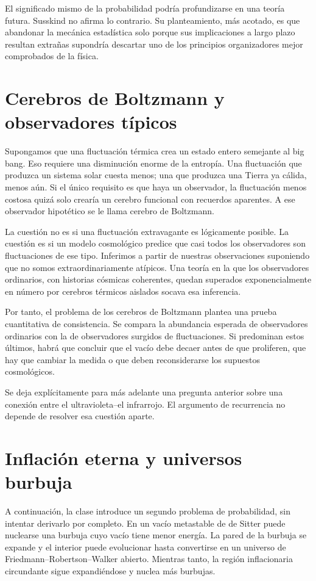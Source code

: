 El significado mismo de la probabilidad podría profundizarse en una teoría futura. Susskind no afirma lo contrario. Su planteamiento, más acotado, es que abandonar la mecánica estadística solo porque sus implicaciones a largo plazo resultan extrañas supondría descartar uno de los principios organizadores mejor comprobados de la física.

\section{Cerebros de Boltzmann y observadores típicos}

Supongamos que una fluctuación térmica crea un estado entero semejante al big bang. Eso requiere una disminución enorme de la entropía. Una fluctuación que produzca un sistema solar cuesta menos; una que produzca una Tierra ya cálida, menos aún. Si el único requisito es que haya un observador, la fluctuación menos costosa quizá solo crearía un cerebro funcional con recuerdos aparentes. A ese observador hipotético se le llama cerebro de Boltzmann.

La cuestión no es si una fluctuación extravagante es lógicamente posible. La cuestión es si un modelo cosmológico predice que casi todos los observadores son fluctuaciones de ese tipo. Inferimos a partir de nuestras observaciones suponiendo que no somos extraordinariamente atípicos. Una teoría en la que los observadores ordinarios, con historias cósmicas coherentes, quedan superados exponencialmente en número por cerebros térmicos aislados socava esa inferencia.

Por tanto, el problema de los cerebros de Boltzmann plantea una prueba cuantitativa de consistencia. Se compara la abundancia esperada de observadores ordinarios con la de observadores surgidos de fluctuaciones. Si predominan estos últimos, habrá que concluir que el vacío debe decaer antes de que proliferen, que hay que cambiar la medida o que deben reconsiderarse los supuestos cosmológicos.

Se deja explícitamente para más adelante una pregunta anterior sobre una conexión entre el ultravioleta--el infrarrojo. El argumento de recurrencia no depende de resolver esa cuestión aparte.

\section{Inflación eterna y universos burbuja}

A continuación, la clase introduce un segundo problema de probabilidad, sin intentar derivarlo por completo. En un vacío metastable de de Sitter puede nuclearse una burbuja cuyo vacío tiene menor energía. La pared de la burbuja se expande y el interior puede evolucionar hasta convertirse en un universo de Friedmann--Robertson--Walker abierto. Mientras tanto, la región inflacionaria circundante sigue expandiéndose y nuclea más burbujas.

